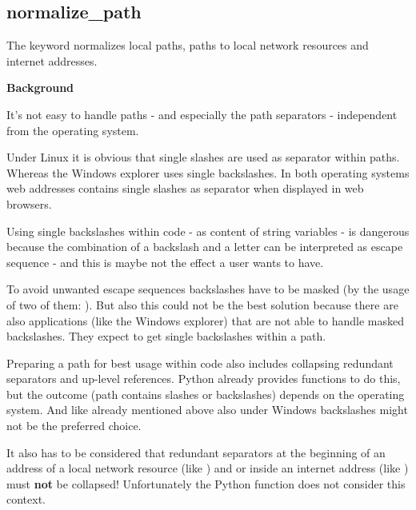 \newpage

\subsection{normalize\_path}

The  keyword normalizes local paths, paths to local network resources and internet addresses.

\vspace{1ex}

\textbf{Background}

It's not easy to handle paths - and especially the path separators - independent from the operating system.

Under Linux it is obvious that single slashes are used as separator within paths. Whereas the Windows explorer
uses single backslashes. In both operating systems web addresses contains single slashes as separator
when displayed in web browsers.

Using single backslashes within code - as content of string variables - is dangerous because the combination
of a backslash and a letter can be interpreted as escape sequence - and this is maybe not the effect a user wants to have.

To avoid unwanted escape sequences backslashes have to be masked (by the usage of two of them: ).
But also this could not be the best solution because there are also applications (like the Windows explorer) that are not able to handle
masked backslashes. They expect to get single backslashes within a path.

Preparing a path for best usage within code also includes collapsing redundant separators and up-level references.
Python already provides functions to do this, but the outcome (path contains slashes or backslashes) depends on the
operating system. And like already mentioned above also under Windows backslashes might not be the preferred choice.

It also has to be considered that redundant separators at the beginning of an address of a local network resource
(like ) and or inside an internet address (like ) must \textbf{not} be collapsed!
Unfortunately the Python function  does not consider this context.

